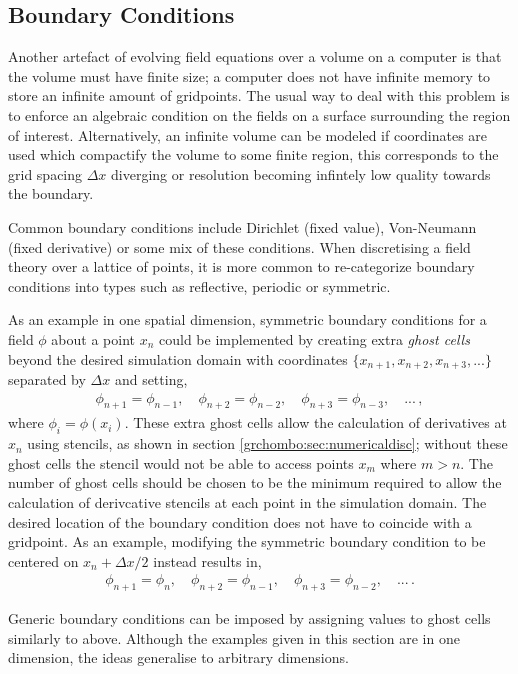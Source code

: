 \subsection{Boundary Conditions} \label{grchombo:sec:bc}
Another artefact of evolving field equations over a volume on a computer is that the volume must have finite size; a computer does not have infinite memory to store an infinite amount of gridpoints. The usual way to deal with this problem is to enforce an algebraic condition on the fields on a surface surrounding the region of interest. Alternatively, an infinite volume can be modeled if coordinates are used which compactify the volume to some finite region, this corresponds to the grid spacing $\Delta x$ diverging or resolution becoming infintely low quality towards the boundary.

Common boundary conditions include Dirichlet (fixed value), Von-Neumann (fixed derivative) or some mix of these conditions. When discretising a field theory over a lattice of points, it is more common to re-categorize boundary conditions into types such as reflective, periodic or symmetric.

As an example in one spatial dimension, symmetric boundary conditions for a field $\phi$ about a point $x_n$ could be implemented by creating extra {\it ghost cells} beyond the desired simulation domain with coordinates $\{x_{n+1},x_{n+2},x_{n+3},...\}$ separated by $\Delta x$ and setting,
\begin{align}
\phi_{n+1} = \phi_{n-1}, \quad \phi_{n+2} = \phi_{n-2}, \quad \phi_{n+3} = \phi_{n-3}, \quad ... \, ,
\end{align}  
where $\phi_i = \phi(x_i)$. These extra ghost cells allow the calculation of derivatives at $x_n$ using stencils, as shown in section \ref{grchombo:sec:numericaldisc}; without these ghost cells the stencil would not be able to access points $x_{m}$ where $m>n$. The number of ghost cells should be chosen to be the minimum required to allow the calculation of derivcative stencils at each point in the simulation domain. The desired location of the boundary condition does not have to coincide with a gridpoint. As an example, modifying the symmetric boundary condition to be centered on $x_n + \Delta x /2$ instead results in,
\begin{align}
\phi_{n+1} = \phi_{n}, \quad \phi_{n+2} = \phi_{n-1}, \quad \phi_{n+3} = \phi_{n-2}, \quad ... \, .
\end{align} 

Generic boundary conditions can be imposed by assigning values to ghost cells similarly to above. Although the examples given in this section are in one dimension, the ideas generalise to arbitrary dimensions.


